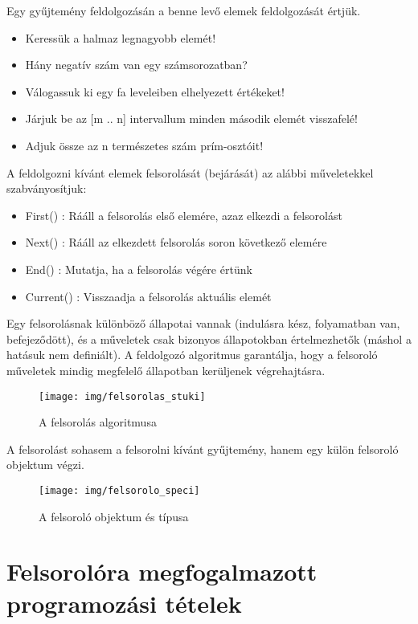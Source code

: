 \documentclass[margin=0px]{article}
\begin{document}
\noindent Egy gyűjtemény feldolgozásán a benne levő elemek
feldolgozását értjük.
\begin{itemize}
    \item	Keressük a halmaz legnagyobb elemét!
    \item	Hány negatív szám van egy számsorozatban?
    \item	Válogassuk ki egy fa leveleiben elhelyezett értékeket!
    \item	Járjuk be az [m .. n] intervallum minden második elemét visszafelé!
    \item	Adjuk össze az n természetes szám prím-osztóit!
\end{itemize}

\noindent A feldolgozni kívánt elemek felsorolását (bejárását) az alábbi
műveletekkel szabványosítjuk:
\begin{itemize}
    \item	First() : Rááll a felsorolás első elemére, azaz elkezdi a felsorolást
    \item	Next() : Rááll az elkezdett felsorolás soron következő elemére
    \item	End() : Mutatja, ha a felsorolás végére értünk
    \item	Current() : Visszaadja a felsorolás aktuális elemét
\end{itemize}

Egy felsorolásnak különböző állapotai vannak (indulásra kész,
folyamatban van, befejeződött), és a műveletek csak bizonyos
állapotokban értelmezhetők (máshol a hatásuk nem definiált).
A feldolgozó algoritmus garantálja,	hogy a felsoroló műveletek mindig
megfelelő állapotban kerüljenek	végrehajtásra.

\begin{figure}[H]
    \centering
    \texttt{[image: img/felsorolas\_stuki]}
    \caption{A felsorolás algoritmusa}
    \label{fig:felsorolas_stuki}
\end{figure}

A felsorolást sohasem a felsorolni kívánt gyűjtemény, hanem
egy külön felsoroló objektum végzi.

\begin{figure}[H]
    \centering
    \texttt{[image: img/felsorolo\_speci]}
    \caption{A felsoroló objektum és típusa}
    \label{fig:felsorolas_stuki}
\end{figure}

\section{Felsorolóra megfogalmazott programozási tételek}
\end{document}
